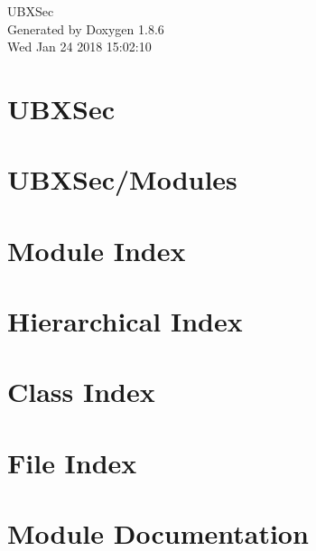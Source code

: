 \documentclass[twoside]{book}
\newcommand{\clearemptydoublepage}{%
  \newpage{\pagestyle{empty}\cleardoublepage}%
}
\begin{document}
\hypersetup{pageanchor=false}
\begin{titlepage}
\vspace*{7cm}
\begin{center}%
{\Large U\-B\-X\-Sec }\\
\vspace*{1cm}
{\large Generated by Doxygen 1.8.6}\\
\vspace*{0.5cm}
{\small Wed Jan 24 2018 15:02:10}\\
\end{center}
\end{titlepage}
\clearemptydoublepage
\tableofcontents
\clearemptydoublepage
{}
\hypersetup{pageanchor=true}

\chapter{U\-B\-X\-Sec}
\label{md__home_travis_build_marcodeltutto_UBXSec_README}
\hypertarget{md__home_travis_build_marcodeltutto_UBXSec_README}{}

\chapter{U\-B\-X\-Sec/\-Modules}
\label{md__home_travis_build_marcodeltutto_UBXSec_Modules_README}
\hypertarget{md__home_travis_build_marcodeltutto_UBXSec_Modules_README}{}

\chapter{Module Index}

\chapter{Hierarchical Index}

\chapter{Class Index}

\chapter{File Index}

\chapter{Module Documentation}


\end{document}
